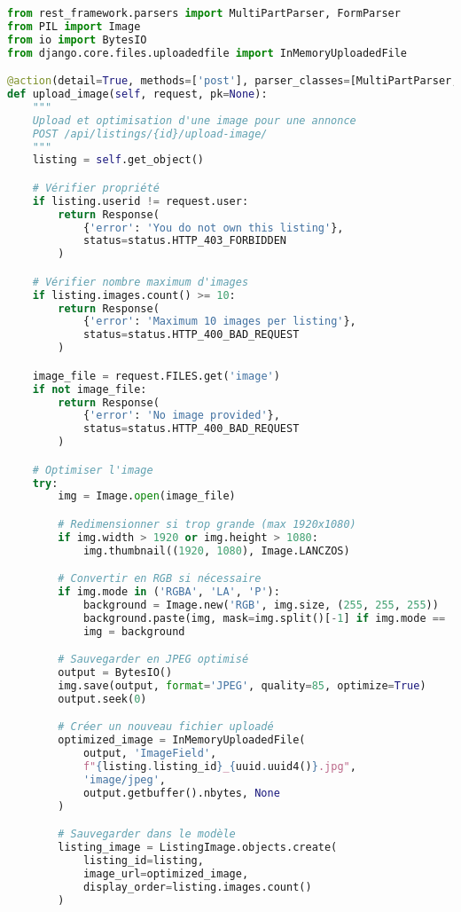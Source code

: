 \begin{lstlisting}[language=Python, caption=listings/views.py - Upload images]
from rest_framework.parsers import MultiPartParser, FormParser
from PIL import Image
from io import BytesIO
from django.core.files.uploadedfile import InMemoryUploadedFile

@action(detail=True, methods=['post'], parser_classes=[MultiPartParser, FormParser])
def upload_image(self, request, pk=None):
    """
    Upload et optimisation d'une image pour une annonce
    POST /api/listings/{id}/upload-image/
    """
    listing = self.get_object()

    # Vérifier propriété
    if listing.userid != request.user:
        return Response(
            {'error': 'You do not own this listing'},
            status=status.HTTP_403_FORBIDDEN
        )

    # Vérifier nombre maximum d'images
    if listing.images.count() >= 10:
        return Response(
            {'error': 'Maximum 10 images per listing'},
            status=status.HTTP_400_BAD_REQUEST
        )

    image_file = request.FILES.get('image')
    if not image_file:
        return Response(
            {'error': 'No image provided'},
            status=status.HTTP_400_BAD_REQUEST
        )

    # Optimiser l'image
    try:
        img = Image.open(image_file)

        # Redimensionner si trop grande (max 1920x1080)
        if img.width > 1920 or img.height > 1080:
            img.thumbnail((1920, 1080), Image.LANCZOS)

        # Convertir en RGB si nécessaire
        if img.mode in ('RGBA', 'LA', 'P'):
            background = Image.new('RGB', img.size, (255, 255, 255))
            background.paste(img, mask=img.split()[-1] if img.mode == 'RGBA' else None)
            img = background

        # Sauvegarder en JPEG optimisé
        output = BytesIO()
        img.save(output, format='JPEG', quality=85, optimize=True)
        output.seek(0)

        # Créer un nouveau fichier uploadé
        optimized_image = InMemoryUploadedFile(
            output, 'ImageField',
            f"{listing.listing_id}_{uuid.uuid4()}.jpg",
            'image/jpeg',
            output.getbuffer().nbytes, None
        )

        # Sauvegarder dans le modèle
        listing_image = ListingImage.objects.create(
            listing_id=listing,
            image_url=optimized_image,
            display_order=listing.images.count()
        )


\end{lstlisting}
